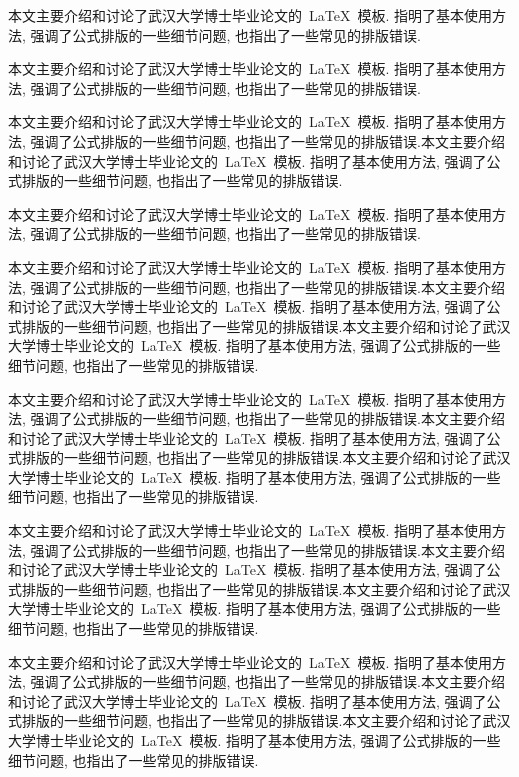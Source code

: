 \begin{cnabstract}
本文主要介绍和讨论了武汉大学博士毕业论文的~\LaTeX~模板.
指明了基本使用方法, 强调了公式排版的一些细节问题, 也指出了一些常见的排版错误.

本文主要介绍和讨论了武汉大学博士毕业论文的~\LaTeX~模板.
指明了基本使用方法, 强调了公式排版的一些细节问题, 也指出了一些常见的排版错误.

本文主要介绍和讨论了武汉大学博士毕业论文的~\LaTeX~模板.
指明了基本使用方法, 强调了公式排版的一些细节问题, 也指出了一些常见的排版错误.本文主要介绍和讨论了武汉大学博士毕业论文的~\LaTeX~模板.
指明了基本使用方法, 强调了公式排版的一些细节问题, 也指出了一些常见的排版错误.



本文主要介绍和讨论了武汉大学博士毕业论文的~\LaTeX~模板.
指明了基本使用方法, 强调了公式排版的一些细节问题, 也指出了一些常见的排版错误.


本文主要介绍和讨论了武汉大学博士毕业论文的~\LaTeX~模板.
指明了基本使用方法, 强调了公式排版的一些细节问题, 也指出了一些常见的排版错误.本文主要介绍和讨论了武汉大学博士毕业论文的~\LaTeX~模板.
指明了基本使用方法, 强调了公式排版的一些细节问题, 也指出了一些常见的排版错误.本文主要介绍和讨论了武汉大学博士毕业论文的~\LaTeX~模板.
指明了基本使用方法, 强调了公式排版的一些细节问题, 也指出了一些常见的排版错误.


本文主要介绍和讨论了武汉大学博士毕业论文的~\LaTeX~模板.
指明了基本使用方法, 强调了公式排版的一些细节问题, 也指出了一些常见的排版错误.本文主要介绍和讨论了武汉大学博士毕业论文的~\LaTeX~模板.
指明了基本使用方法, 强调了公式排版的一些细节问题, 也指出了一些常见的排版错误.本文主要介绍和讨论了武汉大学博士毕业论文的~\LaTeX~模板.
指明了基本使用方法, 强调了公式排版的一些细节问题, 也指出了一些常见的排版错误.


本文主要介绍和讨论了武汉大学博士毕业论文的~\LaTeX~模板.
指明了基本使用方法, 强调了公式排版的一些细节问题, 也指出了一些常见的排版错误.本文主要介绍和讨论了武汉大学博士毕业论文的~\LaTeX~模板.
指明了基本使用方法, 强调了公式排版的一些细节问题, 也指出了一些常见的排版错误.本文主要介绍和讨论了武汉大学博士毕业论文的~\LaTeX~模板.
指明了基本使用方法, 强调了公式排版的一些细节问题, 也指出了一些常见的排版错误.


本文主要介绍和讨论了武汉大学博士毕业论文的~\LaTeX~模板.
指明了基本使用方法, 强调了公式排版的一些细节问题, 也指出了一些常见的排版错误.本文主要介绍和讨论了武汉大学博士毕业论文的~\LaTeX~模板.
指明了基本使用方法, 强调了公式排版的一些细节问题, 也指出了一些常见的排版错误.本文主要介绍和讨论了武汉大学博士毕业论文的~\LaTeX~模板.
指明了基本使用方法, 强调了公式排版的一些细节问题, 也指出了一些常见的排版错误.



\end{cnabstract}

